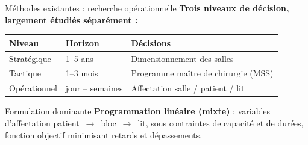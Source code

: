 
\begin{frame}{Méthodes existantes : recherche opérationnelle}
  \textbf{Trois niveaux de décision, largement étudiés séparément :}
  \vspace{0.3em}
  \begin{table}
    \centering\small
    \begin{tabular}{lll}
      \toprule
      \textbf{Niveau} & \textbf{Horizon} & \textbf{Décisions} \\
      \midrule
      Stratégique & 1--5 ans & Dimensionnement des salles \\
      Tactique & 1--3 mois & Programme maître de chirurgie (MSS) \\
      Opérationnel & jour -- semaines & Affectation salle / patient / lit \\
      \bottomrule
    \end{tabular}
  \end{table}
  \begin{block}{Formulation dominante}
    \textbf{Programmation linéaire (mixte)} : variables d'affectation
    patient~$\rightarrow$~bloc~$\rightarrow$~lit, sous contraintes de capacité
    et de durées, fonction objectif minimisant retards et dépassements.
  \end{block}
\end{frame}

